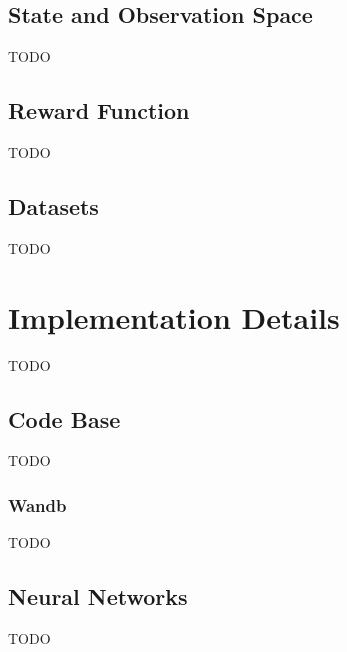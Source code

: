 \documentclass[../xlapes02]{subfiles}
\begin{document}
    \subsection{State and Observation Space}\label{subsec:state-space}
    TODO

    \subsection{Reward Function}\label{subsec:reward-function}
    TODO

    \subsection{Datasets}\label{sec:datasets}
    TODO


    \section{Implementation Details}\label{sec:implementation-details}
    TODO

    \subsection{Code Base}\label{sec:code-base}
    TODO

    \subsubsection{Wandb}\label{sec:wandb}
    TODO

    \subsection{Neural Networks}\label{sec:neural-network}
    TODO

\end{document}
